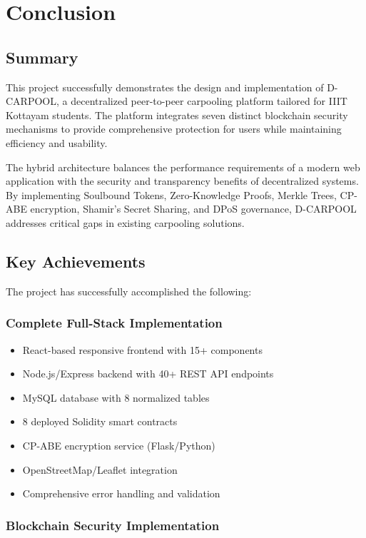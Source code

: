 \chapter{Conclusion}

\section{Summary}

This project successfully demonstrates the design and implementation of D-CARPOOL, a decentralized peer-to-peer carpooling platform tailored for IIIT Kottayam students. The platform integrates seven distinct blockchain security mechanisms to provide comprehensive protection for users while maintaining efficiency and usability.

The hybrid architecture balances the performance requirements of a modern web application with the security and transparency benefits of decentralized systems. By implementing Soulbound Tokens, Zero-Knowledge Proofs, Merkle Trees, CP-ABE encryption, Shamir's Secret Sharing, and DPoS governance, D-CARPOOL addresses critical gaps in existing carpooling solutions.

\section{Key Achievements}

The project has successfully accomplished the following:

\subsection{Complete Full-Stack Implementation}

\begin{itemize}
    \item React-based responsive frontend with 15+ components
    \item Node.js/Express backend with 40+ REST API endpoints
    \item MySQL database with 8 normalized tables
    \item 8 deployed Solidity smart contracts
    \item CP-ABE encryption service (Flask/Python)
    \item OpenStreetMap/Leaflet integration
    \item Comprehensive error handling and validation
\end{itemize}

\subsection{Blockchain Security Implementation}

